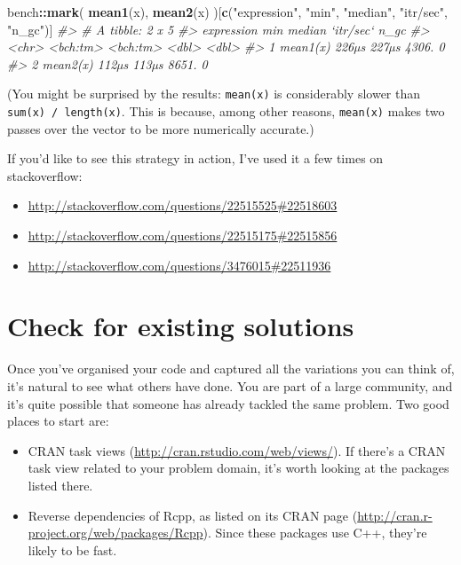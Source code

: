 \documentclass[]{book}
\newenvironment{Shaded}{\begin{snugshade}}{\end{snugshade}}
\newcommand{\CommentTok}[1]{\textcolor[rgb]{0.37,0.37,0.37}{\textit{#1}}}
\newcommand{\KeywordTok}[1]{\textcolor[rgb]{0.27,0.27,0.27}{\textbf{#1}}}
\newcommand{\NormalTok}[1]{#1}
\newcommand{\OperatorTok}[1]{\textcolor[rgb]{0.43,0.43,0.43}{\textbf{#1}}}
\newcommand{\StringTok}[1]{\textcolor[rgb]{0.5,0.5,0.5}{#1}}
\providecommand{\tightlist}{%
  \setlength{\itemsep}{0pt}\setlength{\parskip}{0pt}}
\renewcommand{\href}[2]{#2 (\url{#1})}
\begin{document}
\begin{Shaded}
\begin{Highlighting}[]
\NormalTok{bench}\OperatorTok{::}\KeywordTok{mark}\NormalTok{(}
  \KeywordTok{mean1}\NormalTok{(x),}
  \KeywordTok{mean2}\NormalTok{(x)}
\NormalTok{)[}\KeywordTok{c}\NormalTok{(}\StringTok{"expression"}\NormalTok{, }\StringTok{"min"}\NormalTok{, }\StringTok{"median"}\NormalTok{, }\StringTok{"itr/sec"}\NormalTok{, }\StringTok{"n_gc"}\NormalTok{)]}
\CommentTok{#> # A tibble: 2 x 5}
\CommentTok{#>   expression      min   median `itr/sec`  n_gc}
\CommentTok{#>   <chr>      <bch:tm> <bch:tm>     <dbl> <dbl>}
\CommentTok{#> 1 mean1(x)      226µs    227µs     4306.     0}
\CommentTok{#> 2 mean2(x)      112µs    113µs     8651.     0}
\end{Highlighting}
\end{Shaded}

(You might be surprised by the results: \texttt{mean(x)} is considerably slower than \texttt{sum(x)\ /\ length(x)}. This is because, among other reasons, \texttt{mean(x)} makes two passes over the vector to be more numerically accurate.)

If you'd like to see this strategy in action, I've used it a few times on stackoverflow:

\begin{itemize}
\tightlist
\item
  \url{http://stackoverflow.com/questions/22515525\#22518603}
\item
  \url{http://stackoverflow.com/questions/22515175\#22515856}
\item
  \url{http://stackoverflow.com/questions/3476015\#22511936}
\end{itemize}

\hypertarget{already-solved}{%
\section{Check for existing solutions}\label{already-solved}}

Once you've organised your code and captured all the variations you can think of, it's natural to see what others have done. You are part of a large community, and it's quite possible that someone has already tackled the same problem. Two good places to start are:

\begin{itemize}
\item
  \href{http://cran.rstudio.com/web/views/}{CRAN task views}. If there's a
  CRAN task view related to your problem domain, it's worth looking at
  the packages listed there.
\item
  Reverse dependencies of Rcpp, as listed on its
  \href{http://cran.r-project.org/web/packages/Rcpp}{CRAN page}. Since these
  packages use C++, they're likely to be fast.
\end{itemize}
\end{document}
